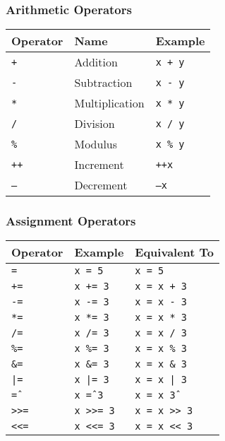 \documentclass{article}
\begin{document}
\subsubsection{Arithmetic Operators}
\begin{center}
\begin{tabular}{@{}lll@{}}
\toprule
\textbf{Operator} & \textbf{Name} & \textbf{Example} \\
\midrule
\texttt{+}  & Addition       & \texttt{x + y} \\
\texttt{-}  & Subtraction    & \texttt{x - y} \\
\texttt{*}  & Multiplication & \texttt{x * y} \\
\texttt{/}  & Division       & \texttt{x / y} \\
\texttt{\%} & Modulus        & \texttt{x \% y} \\
\texttt{++} & Increment      & \texttt{++x} \\
\texttt{--} & Decrement      & \texttt{--x} \\
\bottomrule
\end{tabular}
\end{center}

\vspace{1em}
\subsubsection{Assignment Operators}
\begin{center}
\begin{tabular}{@{}lll@{}}
\toprule
\textbf{Operator} & \textbf{Example} & \textbf{Equivalent To} \\
\midrule
\texttt{=}    & \texttt{x = 5}    & \texttt{x = 5} \\
\texttt{+=}   & \texttt{x += 3}   & \texttt{x = x + 3} \\
\texttt{-=}   & \texttt{x -= 3}   & \texttt{x = x - 3} \\
\texttt{*=}   & \texttt{x *= 3}   & \texttt{x = x * 3} \\
\texttt{/=}   & \texttt{x /= 3}   & \texttt{x = x / 3} \\
\texttt{\%=}  & \texttt{x \%= 3}  & \texttt{x = x \% 3} \\
\texttt{\&=}  & \texttt{x \&= 3}  & \texttt{x = x \& 3} \\
\texttt{|=}   & \texttt{x |= 3}   & \texttt{x = x | 3} \\
\texttt{\^=}  & \texttt{x \^= 3}  & \texttt{x = x \^ 3} \\
\texttt{>>=}  & \texttt{x >>= 3}  & \texttt{x = x >> 3} \\
\texttt{<<=}  & \texttt{x <<= 3}  & \texttt{x = x << 3} \\
\bottomrule
\end{tabular}
\end{center}
\end{document}
